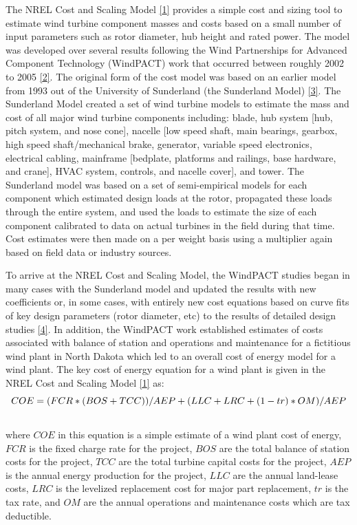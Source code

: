 \documentclass[letterpaper,10pt,openany,oneside]{sphinxmanual}
\begin{document}
The NREL Cost and Scaling Model {\hyperref[theory:1]{{[}1{]}}} provides a simple cost and sizing tool to estimate wind turbine component masses and costs based on a small number of input parameters such as rotor diameter, hub height and rated power.  The model was developed over several results following the Wind Partnerships for Advanced Component Technology (WindPACT) work that occurred between roughly 2002 to 2005 {\hyperref[theory:2]{{[}2{]}}}.  The original form of the cost model was based on an earlier model from 1993 out of the University of Sunderland (the Sunderland Model) {\hyperref[theory:3]{{[}3{]}}}.  The Sunderland Model created a set of wind turbine models to estimate the mass and cost of all major wind turbine components including: blade, hub system {[}hub, pitch system, and nose cone{]}, nacelle {[}low speed shaft, main bearings, gearbox, high speed shaft/mechanical brake, generator, variable speed electronics, electrical cabling, mainframe {[}bedplate, platforms and railings, base hardware, and crane{]}, HVAC system, controls, and nacelle cover{]}, and tower.  The Sunderland model was based on a set of semi-empirical models for each component which estimated design loads at the rotor, propagated these loads through the entire system, and used the loads to estimate the size of each component calibrated to data on actual turbines in the field during that time.  Cost estimates were then made on a per weight basis using a multiplier again based on field data or industry sources.

To arrive at the NREL Cost and Scaling Model, the WindPACT studies began in many cases with the Sunderland model and updated the results with new coefficients or, in some cases, with entirely new cost equations based on curve fits of key design parameters (rotor diameter, etc) to the results of detailed design studies {\hyperref[theory:4]{{[}4{]}}}.  In addition, the WindPACT work established estimates of costs associated with balance of station and operations and maintenance for a fictitious wind plant in North Dakota which led to an overall cost of energy model for a wind plant.  The key cost of energy equation for a wind plant is given in the NREL Cost and Scaling Model {\hyperref[theory:1]{{[}1{]}}} as:
\begin{gather}
\begin{split}COE = (FCR*(BOS+TCC))/AEP + (LLC + LRC + (1-tr)*OM)/AEP\end{split}\notag\\\begin{split}\end{split}\notag
\end{gather}
where $COE$ in this equation is a simple estimate of a wind plant cost of energy, $FCR$ is the fixed charge rate for the project, $BOS$ are the total balance of station costs for the project, $TCC$ are the total turbine capital costs for the project, $AEP$ is the annual energy production for the project, $LLC$ are the annual land-lease costs, $LRC$ is the levelized replacement cost for major part replacement, $tr$ is the tax rate, and $OM$ are the annual operations and maintenance costs which are tax deductible.
\end{document}
